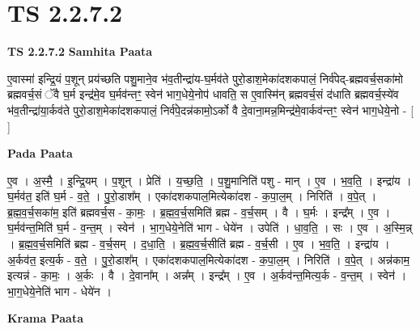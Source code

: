 \documentclass[17pt]{extarticle}
\begin{document}
\section{ TS 2.2.7.2 }

\textbf{TS 2.2.7.2 } \newline
\textbf{Samhita Paata} \newline

ए॒वास्मा॑ इन्द्रि॒यं प॒शून् प्रय॑च्छति पशु॒माने॒व भ॑व॒तीन्द्रा॑य-घ॒र्मव॑ते पुरो॒डाश॒मेका॑दशकपालं॒ निर्व॑पेद्-ब्रह्मवर्च॒सका॑मो ब्रह्मवर्च॒सं ॅवै घ॒र्म इन्द्र॑मे॒व घ॒र्मव॑न्तꣳ॒॒ स्वेन॑ भाग॒धेये॒नोप॑ धावति॒ स ए॒वास्मि॑न् ब्रह्मवर्च॒सं द॑धाति ब्रह्मवर्च॒स्ये॑व भ॑व॒तीन्द्रा॑या॒र्कव॑ते पुरो॒डाश॒मेका॑दशकपालं॒ निर्व॑पे॒दन्न॑कामो॒ऽर्को वै दे॒वाना॒मन्न॒मिन्द्र॑मे॒वार्कव॑न्तꣳ॒॒ स्वेन॑ भाग॒धेये॒नो - [  ] \newline

\textbf{Pada Paata} \newline

ए॒व । अ॒स्मै॒ । इ॒न्द्रि॒यम् । प॒शून् । प्रेति॑ । य॒च्छ॒ति॒ । प॒शु॒मानिति॑ पशु - मान् । ए॒व । भ॒व॒ति॒ । इन्द्रा॑य । घ॒र्मव॑त॒ इति॑ घ॒र्म - व॒ते॒ । पु॒रो॒डाश᳚म् । एका॑दशकपाल॒मित्येका॑दश - क॒पा॒ल॒म् । निरिति॑ । व॒पे॒त् । ब्र॒ह्म॒व॒र्च॒सका॑म॒ इति॑ ब्रह्मवर्च॒स - का॒मः॒ । ब्र॒ह्म॒व॒र्च॒समिति॑ ब्रह्म - व॒र्च॒सम् । वै । घ॒र्मः । इन्द्र᳚म् । ए॒व । घ॒र्मव॑न्त॒मिति॑ घ॒र्म - व॒न्त॒म् । स्वेन॑ । भा॒ग॒धेये॒नेति॑ भाग - धेये॑न । उपेति॑ । धा॒व॒ति॒ । सः । ए॒व । अ॒स्मि॒न्न् । ब्र॒ह्म॒व॒र्च॒समिति॑ ब्रह्म - व॒र्च॒सम् । द॒धा॒ति॒ । ब्र॒ह्म॒व॒र्च॒सीति॑ ब्रह्म - व॒र्च॒सी । ए॒व । भ॒व॒ति॒ । इन्द्रा॑य । अ॒र्कव॑त॒ इत्य॒र्क - व॒ते॒ । पु॒रो॒डाश᳚म् । एका॑दशकपाल॒मित्येका॑दश - क॒पा॒ल॒म् । निरिति॑ । व॒पे॒त् । अन्न॑काम॒ इत्यन्न॑ - का॒मः॒ । अ॒र्कः । वै । दे॒वाना᳚म् । अन्न᳚म् । इन्द्र᳚म् । ए॒व । अ॒र्कव॑न्त॒मित्य॒र्क - व॒न्त॒म् । स्वेन॑ । भा॒ग॒धेये॒नेति॑ भाग - धेये॑न ।  \newline


\textbf{Krama Paata} \newline
\end{document}
